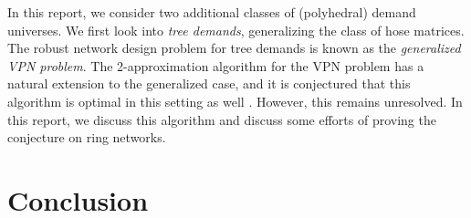 \documentclass[11pt]{article}
\theoremstyle{definition}
\begin{document}
    In this report, we consider two additional classes of (polyhedral) demand universes.
    We first look into \emph{tree demands}, generalizing the class of hose matrices.
    The robust network design problem for tree demands is known as the \emph{generalized VPN problem}.
    The 2-approximation algorithm for the VPN problem has a natural extension to the generalized case, and it is conjectured that this algorithm is optimal in this setting as well \cite{OLVER2016191}.
    However, this remains unresolved.
    In this report, we discuss this algorithm and discuss some efforts of proving the conjecture on ring networks.



    

    

    \section{Conclusion}

    
    
\end{document}
